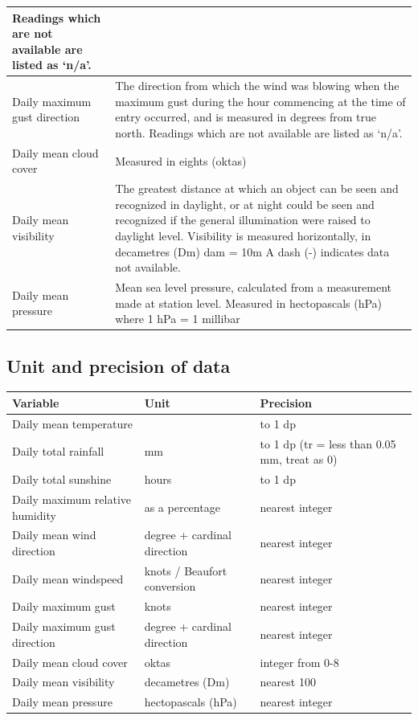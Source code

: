 \documentclass[oneside,fleqn,11pt]{book}
\begin{document}
\begin{tabular}{|p{5.5cm}|p{11.5cm}|}
		Readings which are not available are listed as ‘n/a’.  \\
		\hline
		Daily maximum gust direction & The direction from which the wind was blowing when the maximum gust during the hour commencing at the time of entry occurred, and is measured in degrees from true north.  \newline
		Readings which are not available are listed as ‘n/a’.  \\
		\hline
		Daily mean cloud cover & Measured in eights (oktas)   \\
		\hline
		Daily mean visibility & The greatest distance at which an object can be seen and recognized in daylight, or at night could be seen and recognized if the general illumination were raised to daylight level. 
		\newline Visibility is measured horizontally, in decametres (Dm) dam = 10m \newline A dash (-) indicates data not available.
		\\
		\hline
		Daily mean pressure & Mean sea level pressure, calculated from a measurement made at station level. \newline Measured in hectopascals (hPa) 	where 1 hPa = 1 millibar
		\\
		\hline
	\end{tabular}
	\subsection{Unit and precision of data}
	\begin{tabular}{|l|l|l|}
		\hline
		\textbf{Variable} & \textbf{Unit} & \textbf{Precision}\\
		\hline
		Daily mean temperature & \textcelsius & to 1 dp\\
		\hline
		Daily total rainfall & mm & to 1 dp (tr = less than 0.05 mm, treat as 0)\\
		\hline
		Daily total sunshine & hours & to 1 dp \\
		\hline
		Daily maximum relative humidity & as a percentage & nearest integer \\
		\hline
		Daily mean wind direction & degree + cardinal direction & nearest integer  \\
		\hline
		Daily mean windspeed & knots / Beaufort conversion & nearest integer \\
		\hline
		Daily maximum gust & knots & nearest integer   \\
		\hline
		Daily maximum gust direction & degree + cardinal direction & nearest integer   \\
		\hline
		Daily mean cloud cover & oktas  & integer from 0-8   \\
		\hline
		Daily mean visibility & decametres (Dm) & nearest 100  \\
		\hline
		Daily mean pressure & hectopascals (hPa) & nearest integer  \\
		\hline
	\end{tabular}
	
\end{document}
